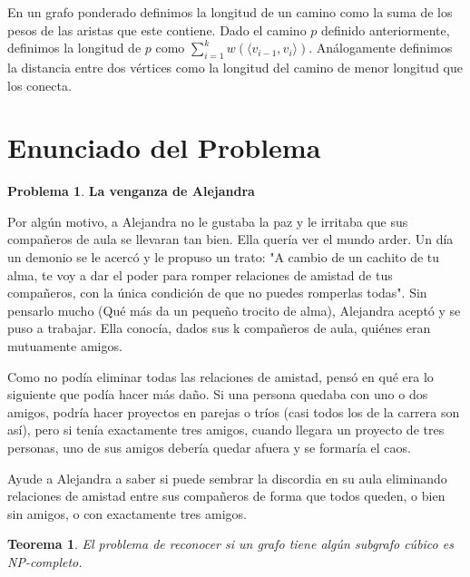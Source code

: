 \documentclass[10pt]{amsart}
\newtheorem{teo}[theorem]{Teorema}
\theoremstyle{definition}
\newtheorem{prob}[theorem]{Problema}
\numberwithin{equation}{section}
\newcommand{\edge}[1]{\langle #1\rangle}
\begin{document}
En un grafo ponderado definimos la longitud de un camino como la suma de los pesos de las aristas que este contiene. Dado el camino $p$ definido anteriormente, definimos la longitud de $p$ como $\sum_{i = 1}^k w(\edge{v_{i - 1}, v_i})$. An\'alogamente definimos la distancia entre dos v\'ertices como la longitud del camino de menor longitud que los conecta.


\section{Enunciado del Problema}
	\begin{prob}
		\textbf{La venganza de Alejandra}
		
		Por algún motivo, a Alejandra no le gustaba la paz y le irritaba que sus compañeros de aula se llevaran tan bien. Ella quería ver el mundo arder. Un día un demonio se le acercó y le propuso un trato: "A cambio de un cachito de tu alma, te voy a dar el poder para romper relaciones de amistad de tus compañeros, con la única condición de que no puedes romperlas todas". Sin pensarlo mucho (Qué más da un pequeño trocito de alma), Alejandra aceptó y se puso a trabajar. Ella conocía, dados sus k compañeros de aula, quiénes eran mutuamente amigos.
		
		Como no podía eliminar todas las relaciones de amistad, pensó en qué era lo siguiente que podía hacer más daño. Si una persona quedaba con uno o dos amigos, podría hacer proyectos en parejas o tríos (casi todos los de la carrera son así), pero si tenía exactamente tres amigos, cuando llegara un proyecto de tres personas, uno de sus amigos debería quedar afuera y se formaría el caos.
		
		Ayude a Alejandra a saber si puede sembrar la discordia en su aula eliminando relaciones de amistad entre sus compañeros de forma que todos queden, o bien sin amigos, o con exactamente tres amigos.
	\end{prob}	

\begin{teo}
	El problema de reconocer si un grafo tiene alg\'un subgrafo c\'ubico es NP-completo.
\end{teo}
\end{document}
